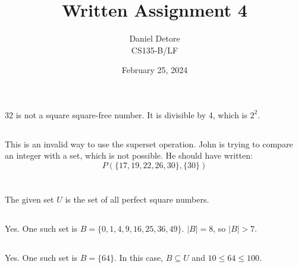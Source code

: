 \documentclass{article}
\title{Written Assignment 4}
\author{Daniel Detore\\CS135-B/LF}
\date{February 25, 2024}
\begin{document}
\maketitle

\section{}
\subsection{}
32 is not a square square-free number. It is divisible by 4, which is $ 2^2 $. 

\subsection{}
This is an invalid way to use the superset operation. John is trying to compare an integer with a set, which is not possible. He should have written:
\begin{equation*}
P (\{17, 19, 22, 26, 30\}, \{30\})
\end{equation*}


\section{}
The given set $U$ is the set of all perfect square numbers.

\subsection{}
Yes. One such set is $B = \{0, 1, 4, 9, 16, 25, 36, 49\}$. $|B| = 8$, so $|B| > 7$.

\subsection{}
Yes. One such set is $B = \{64\}$. In this case, $B \subseteq U$ and $10 \leq 64 \leq 100$.
\end{document}
